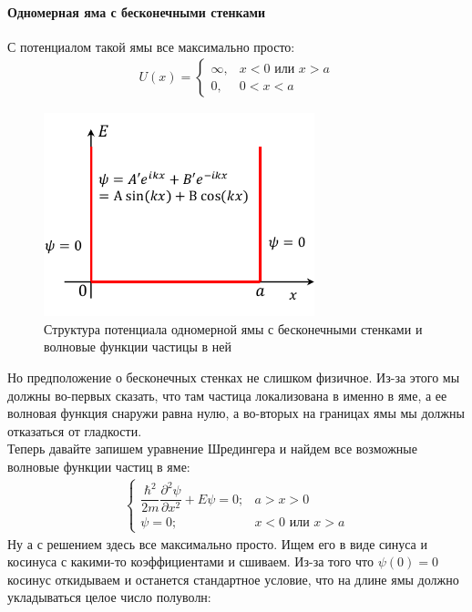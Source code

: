 \documentclass[12pt]{article}
\begin{document}
\paragraph{Одномерная яма с бесконечными стенками}
С потенциалом такой ямы все максимально просто:
\begin{gather*}
    U(x) = \begin{cases}
         \infty, &x<0 \text{ или } x>a \\
          0, &0<x<a 
    \end{cases}
\end{gather*}
\begin{figure}[h]
    \centering
    \includegraphics[width=0.7\textwidth,height=\textheight,keepaspectratio]{Seminar_04/pics/pic_03.pdf}
    \caption{Структура потенциала одномерной ямы с бесконечными стенками и волновые функции частицы в ней}
    \label{fig:sem_04_1D_inf_hole}
\end{figure}
Но предположение о бесконечных стенках не слишком физичное. Из-за этого мы должны во-первых сказать, что там частица локализована в именно в яме, а ее волновая функция снаружи равна нулю, а во-вторых на границах ямы мы должны отказаться от гладкости.\\
Теперь давайте запишем уравнение Шредингера и найдем все возможные волновые функции частиц в яме:
\begin{gather*}
    \begin{cases}
         \dfrac{\hbar^2}{2m}\dfrac{\partial^2\psi}{\partial x^2} +  E\psi=0; &a>x>0  \\[10pt]
         \psi=0;  &x<0 \text{ или } x>a 
    \end{cases}
\end{gather*}
Ну а с решением здесь все максимально просто. Ищем его в виде синуса и косинуса с какими-то коэффициентами и сшиваем. Из-за того что $\psi(0) = 0$ косинус откидываем и останется стандартное условие, что на длине ямы должно укладываться целое число полуволн:
\end{document}
